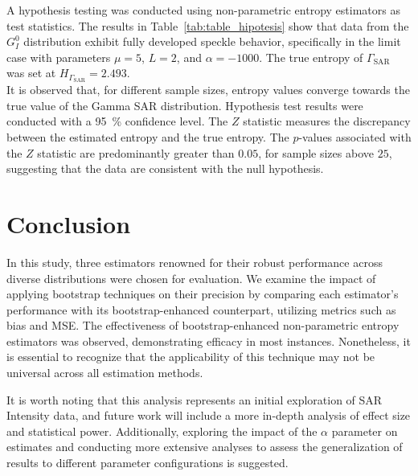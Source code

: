 \documentclass[conference,final,]{IEEEtran}
\begin{document}
A hypothesis testing was conducted using non-parametric entropy
estimators as test statistics. The results in
Table~\ref{tab:table_hipotesis} show that data from the \(G_I^0\)
distribution exhibit fully developed speckle behavior, specifically in
the limit case with parameters \(\mu=5\), \(L=2\), and
\(\alpha= -1000\). The true entropy of \(\Gamma_{\text{SAR}}\) was set
at \(H_{\Gamma_{\text{SAR}}} = 2.493\).\\
It is observed that, for different sample sizes, entropy values converge
towards the true value of the Gamma SAR distribution. Hypothesis test
results were conducted with a \SI{95}{\percent} confidence level. The
\(Z\) statistic measures the discrepancy between the estimated entropy
and the true entropy. The \(p\)-values associated with the \(Z\)
statistic are predominantly greater than \(0.05\), for sample sizes
above \(25\), suggesting that the data are consistent with the null
hypothesis.

\hypertarget{sec:conclusion}{%
\section{Conclusion}\label{sec:conclusion}}

In this study, three estimators renowned for their robust performance
across diverse distributions were chosen for evaluation. We examine the
impact of applying bootstrap techniques on their precision by comparing
each estimator's performance with its bootstrap-enhanced counterpart,
utilizing metrics such as bias and MSE. The effectiveness of
bootstrap-enhanced non-parametric entropy estimators was observed,
demonstrating efficacy in most instances. Nonetheless, it is essential
to recognize that the applicability of this technique may not be
universal across all estimation methods.

It is worth noting that this analysis represents an initial exploration
of SAR Intensity data, and future work will include a more in-depth
analysis of effect size and statistical power. Additionally, exploring
the impact of the \(\alpha\) parameter on estimates and conducting more
extensive analyses to assess the generalization of results to different
parameter configurations is suggested.

\renewcommand\refname{References}

\end{document}
